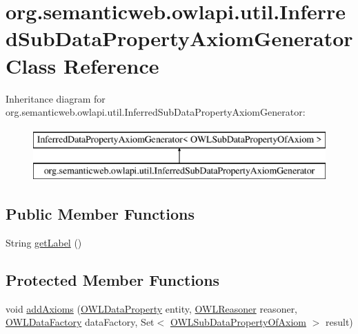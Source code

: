 \hypertarget{classorg_1_1semanticweb_1_1owlapi_1_1util_1_1_inferred_sub_data_property_axiom_generator}{\section{org.\-semanticweb.\-owlapi.\-util.\-Inferred\-Sub\-Data\-Property\-Axiom\-Generator Class Reference}
\label{classorg_1_1semanticweb_1_1owlapi_1_1util_1_1_inferred_sub_data_property_axiom_generator}
}
Inheritance diagram for org.\-semanticweb.\-owlapi.\-util.\-Inferred\-Sub\-Data\-Property\-Axiom\-Generator\-:\begin{figure}[H]
\begin{center}
\leavevmode
\includegraphics[height=2.000000cm]{classorg_1_1semanticweb_1_1owlapi_1_1util_1_1_inferred_sub_data_property_axiom_generator}
\end{center}
\end{figure}
\subsection*{Public Member Functions}
\begin{DoxyCompactItemize}
\item 
String \hyperlink{classorg_1_1semanticweb_1_1owlapi_1_1util_1_1_inferred_sub_data_property_axiom_generator_af44c8483cc37a33d10558d427aea0a45}{get\-Label} ()
\end{DoxyCompactItemize}
\subsection*{Protected Member Functions}
\begin{DoxyCompactItemize}
\item 
void \hyperlink{classorg_1_1semanticweb_1_1owlapi_1_1util_1_1_inferred_sub_data_property_axiom_generator_a336e8be8af69d3cb3bf801a9a16cfd80}{add\-Axioms} (\hyperlink{interfaceorg_1_1semanticweb_1_1owlapi_1_1model_1_1_o_w_l_data_property}{O\-W\-L\-Data\-Property} entity, \hyperlink{interfaceorg_1_1semanticweb_1_1owlapi_1_1reasoner_1_1_o_w_l_reasoner}{O\-W\-L\-Reasoner} reasoner, \hyperlink{interfaceorg_1_1semanticweb_1_1owlapi_1_1model_1_1_o_w_l_data_factory}{O\-W\-L\-Data\-Factory} data\-Factory, Set$<$ \hyperlink{interfaceorg_1_1semanticweb_1_1owlapi_1_1model_1_1_o_w_l_sub_data_property_of_axiom}{O\-W\-L\-Sub\-Data\-Property\-Of\-Axiom} $>$ result)
\end{DoxyCompactItemize}


